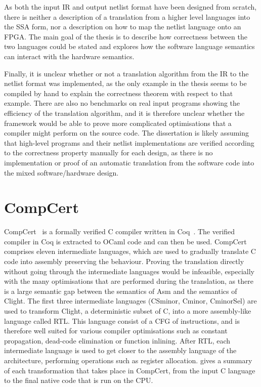 As both the input IR and output netlist format have been designed from scratch,
there is neither a description of a translation from a higher level languages
into the \gls{SSA} form, nor a description on how to map the netlist language
onto an \gls{FPGA}.  The main goal of the thesis is to describe how correctness
between the two languages could be stated and explores how the software language
semantics can interact with the hardware semantics.

Finally, it is unclear whether or not a translation algorithm from the IR to the
netlist format was implemented, as the only example in the thesis seems to be
compiled by hand to explain the correctness theorem with respect to that
example.  There are also no benchmarks on real input programs showing the
efficiency of the translation algorithm, and it is therefore unclear whether the
framework would be able to prove more complicated optimisations that a compiler
might perform on the source code.  The dissertation is likely assuming that
high-level programs and their netlist implementations are verified according to
the correctness property manually for each design, as there is no implementation
or proof of an automatic translation from the software code into the mixed
software/hardware design.

\section{CompCert}%
\label{sec:bg:compcert}

\gls{CompCert}~\cite{leroy06_formal_certif_compil_back_end,leroy09_formal_verif_realis_compil,leroy16_cfvoc}
is a formally verified C compiler written in
Coq~\cite{bertot04_inter_theor_provin_progr_devel}.  The verified compiler in
Coq is extracted to OCaml code and can then be used.  CompCert comprises eleven
intermediate languages, which are used to gradually translate C code into
assembly preserving the behaviour.  Proving the translation directly without
going through the intermediate languages would be infeasible, especially with
the many optimisations that are performed during the translation, as there is a
large semantic gap between the semantics of \gls{Asm} and the semantics of
\gls{Clight}.  The first three intermediate languages (\gls{CSminor},
\gls{Cminor}, \gls{CminorSel}) are used to transform \gls{Clight}, a
deterministic subset of C, into a more assembly-like language called \gls{RTL}.
This language consist of a \gls{CFG} of instructions, and is therefore well
suited for various compiler optimisations such as constant propagation,
dead-code elimination or function inlining.  After \gls{RTL}, each intermediate
language is used to get closer to the assembly language of the architecture,
performing operations such as register allocation.
 gives a summary of each transformation that
takes place in CompCert, from the input C language to the final native code that
is run on the \gls{CPU}.

